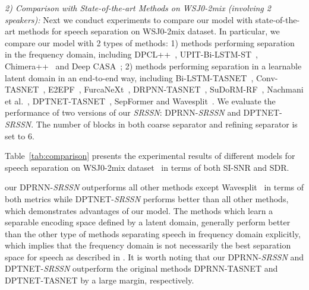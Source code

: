\textit{2) Comparison with State-of-the-art Methods on WSJ0-2mix (involving 2 speakers):}
Next we conduct experiments to compare our model with state-of-the-art methods for speech separation on WSJ0-2mix dataset\cite{DPCL}. In particular, we compare our model with 2 types of methods: 1) methods performing separation in the frequency domain, including DPCL++~\cite{DPCL2}, UPIT-Bi-LSTM-ST~\cite{UPIT}, Chimera++~\cite{Chimera++} and Deep CASA~\cite{CASA}; 2) methods performing separation in a learnable latent domain 
in an end-to-end way, including Bi-LSTM-TASNET~\cite{BLSTM-TasNet}, Conv-TASNET~\cite{Conv-tasnet}, E2EPF~\cite{post},  FurcaNeXt~\cite{furcanext}, DRPNN-TASNET~\cite{DPRNN}, SuDoRM-RF~\cite{sudo}, Nachmani et al.~\cite{MULCAT}, DPTNET-TASNET~\cite{DPTNet}, SepFormer\cite{SepFormer} and Wavesplit~\cite{wavesplit}. We evaluate the performance of two versions of our \emph{SRSSN}: DPRNN-\emph{SRSSN} and DPTNET-\emph{SRSSN}. The number of blocks in both coarse separator and refining separator  is set to 6.

Table~\ref{tab:comparison} presents the experimental results of different models for speech separation on WSJ0-2mix dataset~\cite{wsj0} in terms of both SI-SNR and SDR. 
\begin{comment}
It should be noted that we report all results without using data augmentation for a fair comparison. 
\end{comment}
 our DPRNN-\emph{SRSSN} outperforms all other methods except Wavesplit~\cite{wavesplit} in terms of both metrics while DPTNET-\emph{SRSSN} performs better than all other methods, which demonstrates advantages of our model. The methods which learn a separable encoding space defined by a latent domain, generally perform better than the other type of methods separating speech in frequency domain explicitly, which implies that the frequency domain is not necessarily the best separation space for speech as described in \cite{Conv-tasnet}. It is worth noting that our DPRNN-\emph{SRSSN} and DPTNET-\emph{SRSSN} outperform the original methods DPRNN-TASNET and DPTNET-TASNET by a large margin, respectively.

\begin{comment}
\begin{figure}[!t]
   \centering
   \texttt{[image: memory]}
   \caption{Comparison of GPU memory usage as a function of input speech length at 8Khz sampling rate. The results are reported in inference mode on a single NVIDIA RTX 3090.}
   \label{fig:memory}
\end{figure}
\end{comment}

